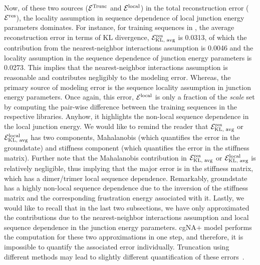 Now, of these two sources (${\mathcal E}^{\text{Trunc}}$ and ${\mathcal E}^{\text{local}}$) in the total reconstruction error (${\mathcal E}^{\text{res}}$), the locality assumption in sequence dependence of local junction energy parameters dominates.
For instance, for training sequences in \Lbdna, the average reconstruction error in terms of KL divergence, ${\mathcal E}_{\text{KL, avg}}^{\text{res}}$ is 0.0313, of which the contribution from the nearest-neighbor interactions assumption is 0.0046 and the locality assumption in the sequence dependence of junction energy parameters is 0.0273. %
This implies that the nearest-neighbor interactions assumption is reasonable and contributes negligibly to the modeling error. 
Whereas, the primary source of modeling error is the sequence locality assumption in junction energy parameters.
Once again, this error, ${\mathcal E}^{\text{local}}$ is only a fraction of the \textit{scale} set by computing the pair-wise difference between the training sequences in the respective libraries. 
Anyhow, it highlights the non-local sequence dependence in the local junction energy.
We would like to remind the reader that ${\mathcal E}_{\text{KL, avg}}^{\text{res}}$ or ${\mathcal E}_{\text{KL, avg}}^{\text{local}}$ has two components, Mahalanobis (which quantifies the error in the groundstate) and stiffness component (which quantifies the error in the stiffness matrix).
Further note that the Mahalanobis contribution in ${\mathcal E}_{\text{KL, avg}}^{\text{res}}$ or ${\mathcal E}_{\text{KL, avg}}^{\text{local}}$ is relatively negligible, thus implying that the major error is in the stiffness matrix, which has a dimer/trimer local sequence dependence.
Remarkably, groundstate has a highly non-local sequence dependence due to the inversion of the stiffness matrix and the corresponding frustration energy associated with it.
Lastly, we would like to recall that in the last two subsections, we have only approximated the contributions due to the nearest-neighbor interactions assumption and local sequence dependence in the junction energy parameters.
cgNA$+$ model performs the computation for these two approximations in one step, and therefore, it is impossible to quantify the associated error individually. 
Truncation using different methods may lead to slightly different quantification of these errors~\cite{petthesis,entropy}.

